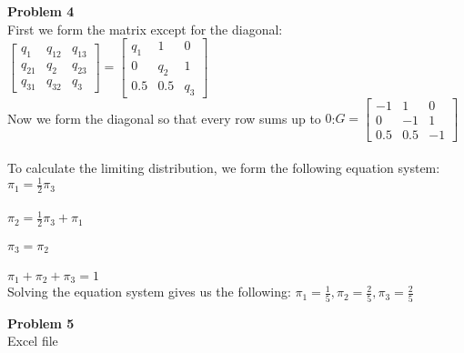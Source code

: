\documentclass{article}
\newenvironment{problem}[2][Problem]
    { \begin{mdframed}[backgroundcolor=gray!20] \textbf{#1 #2} \\}
    {  \end{mdframed}}
\begin{document}
    \begin{problem}{4}
    	First we form the matrix except for the diagonal: $\begin{bmatrix}
    	q_{1} & q_{12} & q_{13} \\
    	q_{21} & q_{2} & q_{23} \\
    	q_{31} & q_{32} & q_{3}
    	\end{bmatrix} = \begin{bmatrix}
    	q_{1} & 1 & 0\\
    	0 & q_{2} & 1\\
    	0.5 & 0.5 & q_{3}
    	\end{bmatrix}$ 
    	\\ Now we form the diagonal so that every row sums up to $0$:$G = \begin{bmatrix}
    	-1 & 1 & 0\\
    	0 & -1 & 1\\
    	0.5 & 0.5 & -1
    	\end{bmatrix}$
    	\\ \\To calculate the limiting distribution, we form the following equation system:\\
    	$\pi_1 = \frac{1}{2}\pi_3$\\ \\$
    	\pi_2 = \frac{1}{2}\pi_3 + \pi_1$\\ \\$
    	\pi_3 = \pi_2$\\ \\$\pi_1+\pi_2+\pi_3 = 1$\\ Solving the equation system gives us the following: $\displaystyle\pi_1=\frac{1}{5} , \pi_2=\frac{2}{5} , \pi_3=\frac{2}{5}$
    	
    \end{problem}
    
    \begin{problem}{5}
    	Excel file
    \end{problem}
    
\end{document}
